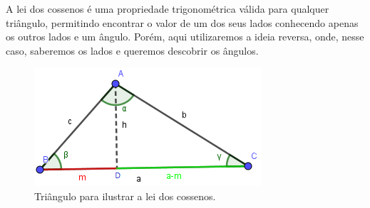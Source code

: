 \documentclass[a4paper,12pt]{article}
\begin{document}
	A lei dos cossenos é uma propriedade trigonométrica válida para qualquer triângulo, permitindo encontrar o valor de um dos seus lados conhecendo apenas os outros lados e um ângulo. Porém, aqui utilizaremos a ideia reversa, onde, nesse caso, saberemos os lados e queremos descobrir os ângulos.
		\begin{figure}[H]
		\begin{center}
			\includegraphics[width=0.50\linewidth]{triangulo.png}
		\end{center}
		\caption{Triângulo para ilustrar a lei dos cossenos.}
		\label{fig:coslaw}
	\end{figure}
\end{document}
